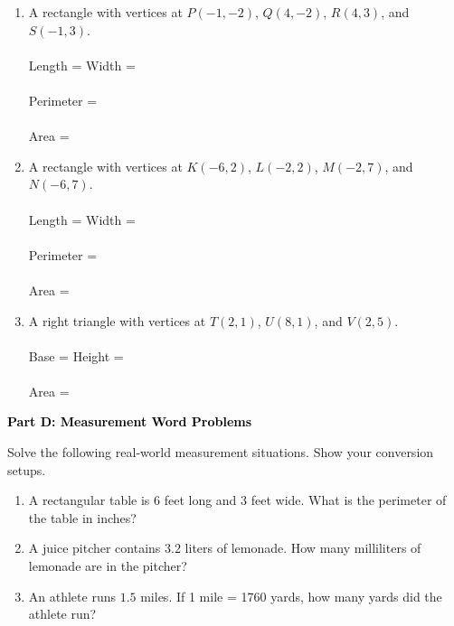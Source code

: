 \documentclass[12pt, letterpaper, fleqn]{article}
\newcommand{\blank}{\underline{\hspace{2.2cm}}}
\newcommand{\blanklong}{\underline{\hspace{6.5cm}}}
\begin{document}
\begin{enumerate}[itemsep=2.2cm, leftmargin=0.6cm]
\item A rectangle with vertices at $P(-1, -2)$, $Q(4, -2)$, $R(4, 3)$, and $S(-1, 3)$. \\ \\
Length = \blank \quad Width = \blank \\ \\
Perimeter = \blanklong \quad \\ \\ Area = \blanklong

\item A rectangle with vertices at $K(-6, 2)$, $L(-2, 2)$, $M(-2, 7)$, and $N(-6, 7)$. \\ \\
Length = \blank \quad Width = \blank \\ \\
Perimeter = \blanklong \quad \\ \\ Area = \blanklong

\item A right triangle with vertices at $T(2, 1)$, $U(8, 1)$, and $V(2, 5)$. \\ \\
Base = \blank \quad Height = \blank \\ \\
Area = \blanklong
\end{enumerate}

\newpage

\begin{tcolorbox}[colback=black!10]
    \large\textcolor{black}{\textbf{Part D: Measurement Word Problems}}
\end{tcolorbox}

\vspace{3mm}

\noindent
Solve the following real-world measurement situations. Show your conversion setups.

\vspace{5mm}

\begin{enumerate}[itemsep=4cm, leftmargin=0.6cm]
\item A rectangular table is $6$ feet long and $3$ feet wide. What is the perimeter of the table in inches?
\vspace{1cm}

\item A juice pitcher contains $3.2$ liters of lemonade. How many milliliters of lemonade are in the pitcher?
\vspace{1cm}

\item An athlete runs $1.5$ miles. If 1 mile = 1760 yards, how many yards did the athlete run?
\end{enumerate}
\end{document}
